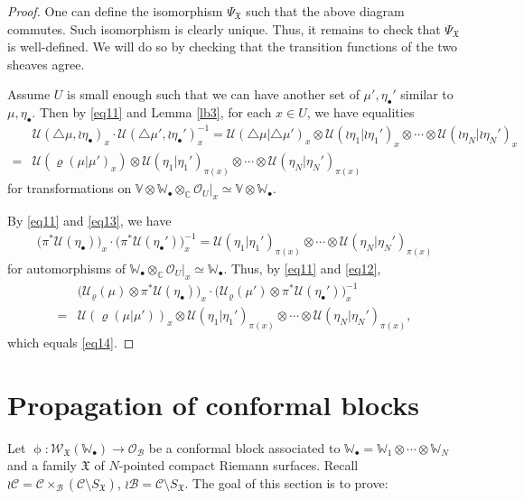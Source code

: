 \documentclass[12pt,a4paper,notitlepage]{article}
\theoremstyle{definition}
\theoremstyle{plain}
\newcommand{\fk}{\mathfrak}
\newcommand{\mc}{\mathcal}
\newcommand{\scr}{\mathscr}
\newcommand{\SX}{{S_{\fk X}}}
\newcommand{\blt}{\bullet}
\newcommand{\Vbb}{\mathbb V}
\newcommand{\Wbb}{\mathbb W}
\newcommand{\Cbb}{\mathbb C}
\numberwithin{equation}{section}
\begin{document}
\begin{proof}
One can define the isomorphism $\Psi_{\fk X}$ such that the above diagram commutes. Such isomorphism is clearly unique. Thus, it remains to check that $\Psi_{\fk X}$ is well-defined. We will do so by checking that the transition functions of the two sheaves agree.

Assume $U$ is small enough such that we can have another set of $\mu',\eta_\blt'$ similar to $\mu,\eta_\blt$. Then by \eqref{eq11} and Lemma \ref{lb3}, for each $x\in U$, we have equalities
\begin{align}
&\mc U(\triangle\mu,\wr\eta_\blt)_x\cdot \mc U(\triangle\mu',\wr\eta_\blt')_x^{-1}=\mc U(\triangle\mu|\triangle\mu')_x\otimes\mc U(\wr\eta_1|\wr\eta_1')_x\otimes\cdots\otimes \mc U(\wr\eta_N|\wr\eta_N')_x \nonumber \\
=&\mc U(\varrho(\mu|\mu')_x)\otimes \mc U(\eta_1|\eta_1')_{\pi(x)}\otimes\cdots\otimes \mc U(\eta_N|\eta_N')_{\pi(x)}\label{eq14}
\end{align}
for transformations on $\Vbb\otimes\Wbb_\blt\otimes_\Cbb\scr O_U|_x\simeq \Vbb\otimes\Wbb_\blt$. 

By \eqref{eq11} and \eqref{eq13},  we have 
\begin{align}
	\big(\pi^*\mc U(\eta_\blt)\big)_x\cdot \big(\pi^*\mc U(\eta_\blt')\big)^{-1}_x=\mc U(\eta_1|\eta_1')_{\pi(x)}\otimes\cdots\otimes \mc U(\eta_N|\eta_N')_{\pi(x)}	
\end{align}
for automorphisms of $\Wbb_\blt\otimes_\Cbb\scr O_U|_x\simeq\Wbb_\blt$. Thus, by \eqref{eq11} and \eqref{eq12},
\begin{align*}
&\big(\mc U_\varrho(\mu)\otimes\pi^*\mc U(\eta_\blt) \big)_x\cdot\big(\mc U_\varrho(\mu')\otimes\pi^*\mc U(\eta_\blt')\big)_x^{-1}\\
=&	\mc U(\varrho(\mu|\mu'))_x\otimes \mc U(\eta_1|\eta_1')_{\pi(x)}\otimes\cdots\otimes \mc U(\eta_N|\eta_N')_{\pi(x)},
\end{align*}
which equals \eqref{eq14}.
\end{proof}









\section{Propagation of conformal blocks}

Let $\upphi:\scr W_{\fk X}(\Wbb_\blt)\rightarrow\scr O_{\mc B}$ be a conformal block associated to $\Wbb_\blt=\Wbb_1\otimes\cdots\otimes\Wbb_N$ and a family $\fk X$ of $N$-pointed compact Riemann surfaces. Recall $\wr\mc C=\mc C\times_{\mc B}(\mc C\setminus\SX)$, $\wr\mc B=\mc C\setminus\SX$. The goal of this section is to prove:
\end{document}
